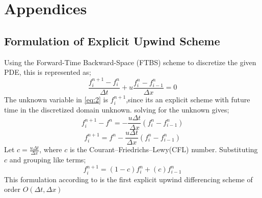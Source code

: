 \section{Appendices}

\subsection{Formulation of Explicit Upwind Scheme}

Using the Forward-Time Backward-Space (FTBS) scheme to discretize the given PDE, this is represented as;
\begin{equation}
\frac{f^{n+1}_{i} - f^{n}_{i}}{\Delta t} + u \frac{f^{n}_{i} - f^{n}_{i-1}}{\Delta x} = 0 \label{eq:2}
\end{equation}
The unknown variable in \eqref{eq:2} is $ f^{n+1}_{i} $,since its an explicit scheme with future time in the discretized domain unknown. solving for the unknown gives;
\begin{equation*}
f^{n+1}_{i} - f^{n} = - \frac{u\Delta t}{\Delta x}(f^{n}_{i} - f^{n}_{i-1})
\end{equation*}
\begin{equation*}
f^{n+1}_{i} = f^{n} - \frac{u\Delta t}{\Delta x}(f^{n}_{i} - f^{n}_{i-1})
\end{equation*}
Let $ c = \frac{u\Delta t}{\Delta x} $, where $ c $ is the Courant–Friedrichs–Lewy(CFL) number. Substituting $ c $ and grouping like terms;
\begin{equation}
\boxed{f^{n+1}_{i} = (1-c)f^{n}_{i} + (c)f^{n}_{i-1}} \label{eq:3}
\end{equation}
This formulation according to \cite{Hoffmann} is the first explicit upwind differencing scheme of order $ O(\Delta t, \Delta x) $

